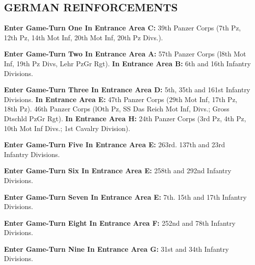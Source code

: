 \subsection{GERMAN REINFORCEMENTS}

\begin{flushleft}
  \textbf{Enter Game-Turn One In Entrance Area C:}
  \break
  39th Panzer Corps (7th Pz, 12th Pz, 14th Mot Inf,
  20th Mot Inf, 20th Pz Divs.).

  \textbf{Enter Game-Turn Two In Entrance Area A:}
  \break
  57th Panzer Corps (l8th Mot Inf, 19th Pz Divs, Lehr PzGr Rgt).
  \break
  \textbf{In Entrance Area B:}
  \break
  6th and 16th Infantry Divisions.

  \textbf{Enter Game-Turn Three In Entrance Area D:}
  \break
  5th, 35th and 161st Infantry Divisions.
  \break
  \textbf{In Entrance Area E:}
  \break
  47th Panzer Corps (29th Mot Inf, 17th Pz, 18th Pz).
  46th Panzer Corps (lOth Pz, SS Das Reich Mot Inf, Divs.; Gross Dtschld PzGr Rgt).
  \break
  \textbf{In Entrance Area H:}
  24th Panzer Corps (3rd Pz, 4th Pz, 10th Mot Inf Divs.; 1st Cavalry Division).

  \textbf{Enter Game-Turn Five In Entrance Area E:}
  \break
  263rd. 137th and 23rd Infantry Divisions.

  \textbf{Enter Game-Turn Six In Entrance Area E:}
  \break
  258th and 292nd Infantry Divisions.

  \textbf{Enter Game-Turn Seven In Entrance Area E:}
  \break
  7th. 15th and 17th Infantry Divisions.

  \textbf{Enter Game-Turn Eight In Entrance Area F:}
  \break
  252nd and 78th Infantry Divisions.

  \textbf{Enter Game-Turn Nine In Entrance Area G:}
  \break
  31st and 34th Infantry Divisions.
\end{flushleft}